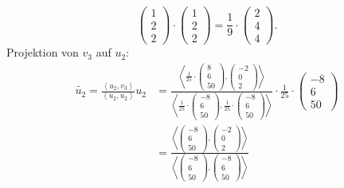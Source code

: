\documentclass[german,12pt]{homework}
\newcommand{\dotproduct}[2]{\left\langle#1, #2\right\rangle}
\begin{document}
\begin{enumerate}
\[{{        \begin{pmatrix}1\\2\\2\end{pmatrix}}} \cdot
        \begin{pmatrix}1\\2\\2\end{pmatrix} = \frac{1}{9} \cdot
        \begin{pmatrix}2\\4\\4\end{pmatrix}.\]
        Projektion von \(v_3\) auf \(u_2\):
        \begin{align*}
            \tilde{u_2} =
            \frac{\dotproduct{u_2}{v_3}}{\dotproduct{u_2}{u_2}}u_2 &=
            \frac{\dotproduct{\frac{1}{25} \cdot \begin{pmatrix}8\\6\\50
            \end{pmatrix}}{\begin{pmatrix}-2\\0\\2\end{pmatrix}}}{\dotproduct{
            \frac{1}{25} \cdot \begin{pmatrix}-8\\6\\50\end{pmatrix}}{
            \frac{1}{25} \cdot \begin{pmatrix}-8\\6\\50\end{pmatrix}}} \cdot
            \frac{1}{25} \cdot \begin{pmatrix}-8\\6\\50\end{pmatrix}\\
            &= \frac{\dotproduct{\begin{pmatrix}
            -8\\6\\50\end{pmatrix}}{\begin{pmatrix}
            -2\\0\\2\end{pmatrix}}}{\dotproduct{\begin{pmatrix}
            -8\\6\\50\end{pmatrix}}{\begin{pmatrix}-8\\6\\50\end{pmatrix}}}

\end{align*}
\end{enumerate}
\end{document}
